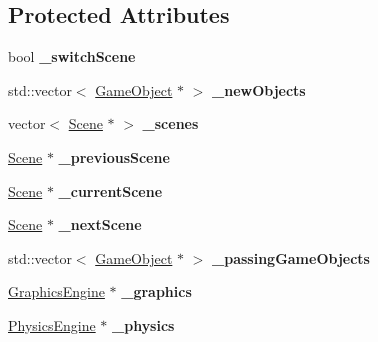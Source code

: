 \subsection*{Protected Attributes}
\begin{DoxyCompactItemize}
\item 
\hypertarget{class_game_engine_a6bb48df06765a1d31310e0bbcf582b2b}{}\label{class_game_engine_a6bb48df06765a1d31310e0bbcf582b2b} 
bool {\bfseries \+\_\+switch\+Scene}
\item 
\hypertarget{class_game_engine_a0ebfd3cc173547a668e763b72449dcc3}{}\label{class_game_engine_a0ebfd3cc173547a668e763b72449dcc3} 
std\+::vector$<$ \hyperlink{class_game_object}{Game\+Object} $\ast$ $>$ {\bfseries \+\_\+new\+Objects}
\item 
\hypertarget{class_game_engine_a857a6cf409bd4697a0ee31238e74b670}{}\label{class_game_engine_a857a6cf409bd4697a0ee31238e74b670} 
vector$<$ \hyperlink{class_scene}{Scene} $\ast$ $>$ {\bfseries \+\_\+scenes}
\item 
\hypertarget{class_game_engine_a0ed9d4b010faefc0fc16b6381c0fd77c}{}\label{class_game_engine_a0ed9d4b010faefc0fc16b6381c0fd77c} 
\hyperlink{class_scene}{Scene} $\ast$ {\bfseries \+\_\+previous\+Scene}
\item 
\hypertarget{class_game_engine_a8d2b7530557db9bcff501fe39cc65539}{}\label{class_game_engine_a8d2b7530557db9bcff501fe39cc65539} 
\hyperlink{class_scene}{Scene} $\ast$ {\bfseries \+\_\+current\+Scene}
\item 
\hypertarget{class_game_engine_a774d8b94d3f52f0387de3eba6804dfa9}{}\label{class_game_engine_a774d8b94d3f52f0387de3eba6804dfa9} 
\hyperlink{class_scene}{Scene} $\ast$ {\bfseries \+\_\+next\+Scene}
\item 
\hypertarget{class_game_engine_aa5a6689bfdebff663b691dfbf64596ec}{}\label{class_game_engine_aa5a6689bfdebff663b691dfbf64596ec} 
std\+::vector$<$ \hyperlink{class_game_object}{Game\+Object} $\ast$ $>$ {\bfseries \+\_\+passing\+Game\+Objects}
\item 
\hypertarget{class_game_engine_a356588004d68586f945ae85bc5060700}{}\label{class_game_engine_a356588004d68586f945ae85bc5060700} 
\hyperlink{class_graphics_engine}{Graphics\+Engine} $\ast$ {\bfseries \+\_\+graphics}
\item 
\hypertarget{class_game_engine_a913f0eb92dda8fc1cd4cec59b9f7c580}{}\label{class_game_engine_a913f0eb92dda8fc1cd4cec59b9f7c580} 
\hyperlink{class_physics_engine}{Physics\+Engine} $\ast$ {\bfseries \+\_\+physics}
\item 
\hypertarget{class_game_engine_a71cb9124b614680cdc4fbe6823900445}{}\label{class_game_engine_a71cb9124b614680cdc4fbe6823900445} 

\end{DoxyCompactItemize}
